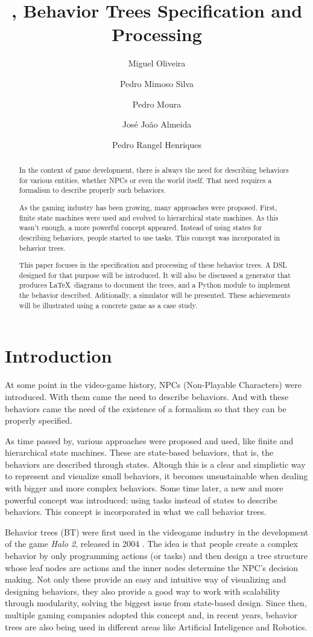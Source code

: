 \documentclass[a4paper,UKenglish,cleveref, autoref, thm-restate]{oasics-v2019}
\title{\bht, Behavior Trees Specification and Processing} %
\author{Miguel Oliveira}{Centro ALGORITMI, DI, Universidade do Minho, Portugal}{}{}{}
\author{Pedro Mimoso Silva}{Centro ALGORITMI, DI, Universidade do Minho, Portugal}{}{}{}
\author{Pedro Moura}{Centro ALGORITMI, DI, Universidade do Minho, Portugal}{}{}{}
\author{José João Almeida}{Centro ALGORITMI, DI, Universidade do Minho, Portugal}{}{}{}
\author{Pedro Rangel Henriques}{Centro ALGORITMI, DI, Universidade do Minho, Portugal}{}{}{}
\begin{document}
\maketitle

\begin{abstract}
In the context of game development, there is always the need for describing behaviors for various entities, whether NPCs or even the world itself.
That need requires a formalism to describe properly such behaviors.

As the gaming industry has been growing, many approaches were proposed.
First, finite state machines were used and evolved to hierarchical state machines.
As this wasn't enough, a more powerful concept appeared.
Instead of using states for describing behaviors, people started to use tasks.
This concept was incorporated in behavior trees.

This paper focuses in the specification and processing of these behavior trees.
A DSL designed for that purpose will be introduced.
It will also be discussed a generator that produces \LaTeX\ diagrams to document the trees, and a Python module to implement the behavior described.
Aditionally, a simulator will be presented. 
These achievements will be illustrated using a concrete game as a case study.
\end{abstract}


\section{Introduction}
\label{sec:introduction}

At some point in the video-game history, NPCs (Non-Playable Characters) were introduced. 
With them came the need to describe behaviors.
And with these behaviors came the need of the existence of a formalism so that they can be properly specified.

As time passed by, various approaches were proposed and used, like finite and hierarchical state machines.
These are state-based behaviors, that is, the behaviors are described through states.
Altough this is a clear and simplistic way to represent and visualize small behaviors, it becomes unsustainable when dealing with bigger and more complex behaviors.
Some time later, a new and more powerful concept was introduced: using tasks instead of states to describe behaviors.
This concept is incorporated in what we call behavior trees.

Behavior trees (BT) were first used in the videogame industry in the development of the game \textit{Halo 2}, released in 2004 \cite{Cuadrado2018}.
The idea is that people create a complex behavior by only programming actions (or tasks) and then design a tree structure whose leaf nodes are actions and the inner nodes determine the NPC's decision making.
Not only these provide an easy and intuitive way of visualizing and designing behaviors, they also provide a good way to work with scalability through modularity, solving the biggest issue from state-based design.
Since then, multiple gaming companies adopted this concept and, in recent years, behavior trees are also being used in different areas like Artificial Inteligence and Robotics.
\end{document}
